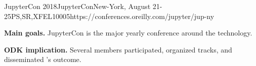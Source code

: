 \begin{event}{JupyterCon 2018}{JupyterCon}{New-York, August 21-25}{PS,SR,XFEL}{1000}{5}{https://conferences.oreilly.com/jupyter/jup-ny}

  \textbf{Main goals.} JupyterCon is the major yearly conference
  around the \Jupyter technology.

  \textbf{ODK implication.} Several \ODK members participated,
  organized tracks, and disseminated \ODK's outcome.

\end{event}
